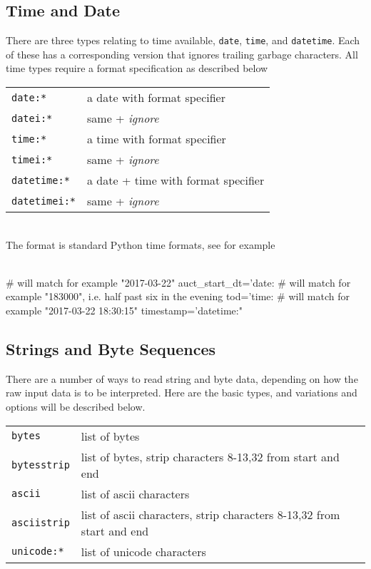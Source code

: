 \subsection{Time and Date}
There are three types relating to time available, \texttt{date},
\texttt{time}, and \texttt{datetime}.  Each of these has a
corresponding version that ignores trailing garbage characters.
All time types require a format specification as described below\\

\begin{tabular}{ll}
  \texttt{date:*}      & a date with format specifier\\
  \texttt{datei:*}     & same + \emph{ignore}\\
  \texttt{time:*}      & a time with format specifier\\
  \texttt{timei:*}     & same + \emph{ignore}\\
  \texttt{datetime:*}  & a date + time with format specifier\\
  \texttt{datetimei:*} & same + \emph{ignore}\\
\end{tabular}\\

The format is standard Python time formats, see for example\\
\\
\begin{python}
   # will match for example "2017-03-22"
   auct_start_dt='date:%
   # will match for example "183000", i.e. half past six in the evening
   tod='time:%
   # will match for example "2017-03-22 18:30:15"
   timestamp='datetime:"%
\end{python}


\subsection{Strings and Byte Sequences}
There are a number of ways to read string and byte data, depending on
how the raw input data is to be interpreted.  Here are the basic
types, and variations and options will be described below.\\

\begin{tabular}{ll}
  \texttt{bytes}      & list of bytes\\
  \texttt{bytesstrip} & list of bytes, strip characters 8-13,32 from start and end\\
  \texttt{ascii}      & list of ascii characters\\
  \texttt{asciistrip} & list of ascii characters, strip characters 8-13,32 from start and end\\
  \texttt{unicode:*}    & list of unicode characters\\
\end{tabular}\\

